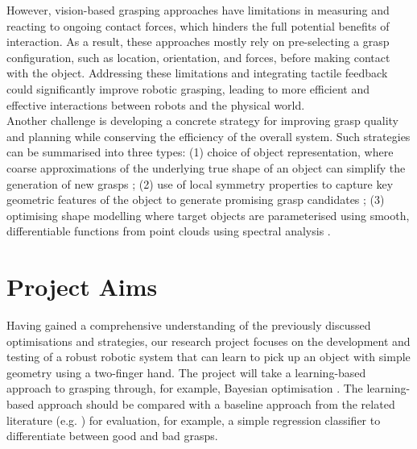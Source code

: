 \documentclass[11pt, a4paper]{report}
\begin{document}
However, vision-based grasping approaches have limitations in measuring and reacting to ongoing contact forces, which hinders the full potential benefits of interaction. As a result, these approaches mostly rely on pre-selecting a grasp configuration, such as location, orientation, and forces, before making contact with the object. Addressing these limitations and integrating tactile feedback could significantly improve robotic grasping, leading to more efficient and effective interactions between robots and the physical world.\\

Another challenge is developing a concrete strategy for improving grasp quality and planning while conserving the efficiency of the overall system. Such strategies can be summarised into three types: (1) choice of object representation, where coarse approximations of the underlying true shape of an object can simplify the generation of new grasps \cite{de_Farias_2021} \cite{geidenstam_2009}; (2) use of local symmetry properties to capture key geometric features of the object to generate promising grasp candidates \cite{de_Farias_2021}; (3) optimising shape modelling where target objects are parameterised using smooth, differentiable functions from point clouds using spectral analysis \cite{de_Farias_2021}.


\section{Project Aims}\label{sec:1.2}
Having gained a comprehensive understanding of the previously discussed optimisations and strategies, our research project focuses on the development and testing of a robust robotic system that can learn to pick up an object with simple geometry using a two-finger hand. The project will take a learning-based approach to grasping through, for example, Bayesian optimisation \cite{nogueira2016unscented, frazier2018tutorial}. The learning-based approach should be compared with a baseline approach from the related literature (e.g. \cite{nogueira2016unscented, danielczuk2020exploratory, breyer2020volumetric}) for evaluation, for example, a simple regression classifier to differentiate between good and bad grasps.
\end{document}
